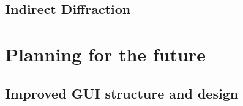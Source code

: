 \documentclass[paper=a4, fontsize=11pt]{scrartcl}	%
\numberwithin{equation}{section}															%
\numberwithin{figure}{section}																%
\numberwithin{table}{section}																%
\begin{document}
\subsection{Indirect Diffraction}
\label{subsec:indirect-diffraction}
%
%
%
\section{Planning for the future}
\subsection{Improved GUI structure and design}
\label{subsec:GUI-Improvements}



\end{document}
